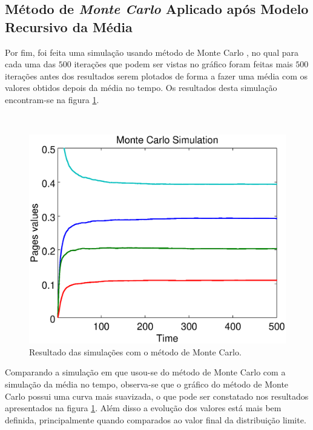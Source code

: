 \documentclass[a4paper]{report} %
\begin{document}
\subsection*{Método de \textit{Monte Carlo} Aplicado após Modelo Recursivo da Média}

Por fim, foi feita uma simulação usando método de Monte Carlo \cite{avrachenkov2007monte}, no qual para cada uma das $500$ iterações que podem ser vistas no gráfico foram feitas mais $500$ iterações antes dos resultados serem plotados de forma a fazer uma média com os valores obtidos depois da média no tempo. Os resultados desta simulação encontram-se na figura \ref{montecarlo}.

\
\begin{figure}[!htb]
	\centering
	\includegraphics[scale=0.3]{imagens/montecarlo}
	\caption{Resultado das simulações com o método de Monte Carlo.}
	\label{montecarlo}
\end{figure}

Comparando a simulação em que usou-se do método de Monte Carlo com a simulação da média no tempo, observa-se que o gráfico do método de Monte Carlo possui uma curva mais suavizada, o que pode ser constatado nos resultados apresentados na figura \ref{montecarlo}. Além disso a evolução dos valores está mais bem definida, principalmente quando comparados ao valor final da distribuição limite.
\end{document}
